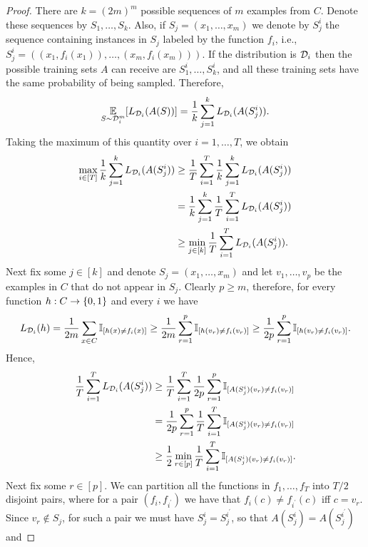 \documentclass[11pt,a4paper]{article}
\begin{document}
\begin{proof}
There are $k = (2m)^m$ possible sequences of $m$ examples from $C$. Denote these sequences by $S_1,\ldots,S_k$. Also, if $S_j = (x_1,\ldots,x_m)$ we denote by $S_j^i$ the sequence containing instances in $S_j$ labeled by the function $f_i$, i.e., $S_j^i= ((x_1,f_i(x_1)),\ldots,(x_m,f_i(x_m)))$. If the distribution is $\mathcal{D}_i$ then the possible training sets $A$ can receive are $S_1^i,\ldots,S^i_k$, and all these training sets have the same probability of being sampled. Therefore,
\begin{equation}\label{eqn:expectation_L}
    \underset{S\sim\mathcal{D}_i^m}{\mathbb{E}}[L_{\mathcal{D}_i}(A(S))] = \frac{1}{k}\sum_{j=1}^k L_{\mathcal{D}_i}(A(S_j^i)).
\end{equation}
Taking the maximum of this quantity over $i = 1,\ldots,T$, we obtain
\begin{align}
    \max_{i\in[T]} \dfrac{1}{k} \sum_{j = 1}^k L_{\mathcal{D}_i}(A(S_j^i)) &\ge \dfrac{1}{T}\sum_{i=1}^T \dfrac{1}{k} \sum_{j = 1}^k L_{\mathcal{D}_i}(A(S_j^i)) \nonumber \\
    &= \dfrac{1}{k} \sum_{j = 1}^k \dfrac{1}{T}\sum_{i=1}^T L_{\mathcal{D}_i}(A(S_j^i)) \nonumber \\
    &\ge \min_{j\in[k]} \dfrac{1}{T}\sum_{i=1}^T L_{\mathcal{D}_i}(A(S_j^i)).\label{eqn:max_L}
\end{align}
Next fix some $j\in[k]$ and denote $S_j = (x_1,\ldots,x_m)$ and let $v_1,\ldots,v_p$ be the examples in $C$ that do not appear in $S_j$. Clearly $p\ge m$, therefore, for every function $h:C\rightarrow \{0,1\}$ and every $i$ we have
\begin{equation*}
    L_{\mathcal{D}_i}(h) = \dfrac{1}{2m} \sum_{x\in C}\mathbb{I}_{[h(x)\neq f_i(x)]} \ge \dfrac{1}{2m} \sum_{r=1}^p \mathbb{I}_{[h(v_r)\neq f_i(v_r)]} \ge \dfrac{1}{2p} \sum_{r=1}^p \mathbb{I}_{[h(v_r)\neq f_i(v_r)]}.
\end{equation*}
Hence,
\begin{align}
    \dfrac{1}{T}\sum_{i=1}^T L_{\mathcal{D}_i}(A(S_j^i)) &\ge \dfrac{1}{T}\sum_{i=1}^T \dfrac{1}{2p} \sum_{r=1}^p \mathbb{I}_{[A(S_j^i)(v_r)\neq f_i(v_r)]}\nonumber \\
    &= \dfrac{1}{2p} \sum_{r=1}^p \dfrac{1}{T}\sum_{i=1}^T \mathbb{I}_{[A(S_j^i)(v_r)\neq f_i(v_r)]} \nonumber\\
    &\ge \dfrac{1}{2} \min_{r\in[p]} \dfrac{1}{T}\sum_{i=1}^T \mathbb{I}_{[A(S_j^i)(v_r)\neq f_i(v_r)]}. \label{eqn:expectation_L_D}
\end{align}
Next fix some $r\in [p]$. We can partition all the functions in $f_1,\ldots, f_T$ into $T/2$ disjoint pairs, where for a pair $(f_i,f_{i^\prime})$ we have that $f_i(c)\neq f_{i^\prime}(c)$ iff $c = v_r$. Since $v_r\notin S_j$, for such a pair we must have $S_j^i = S_j^{i^\prime}$, so that $A(S_j^i) = A(S_j^{i^\prime})$ and 

\end{proof}
\end{document}
